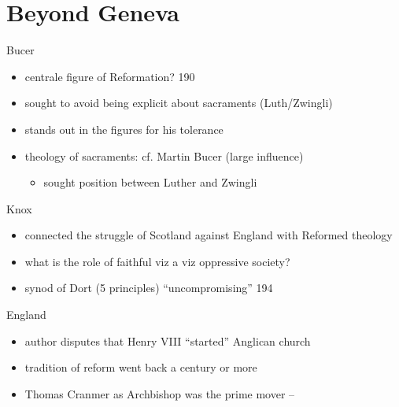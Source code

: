\section{Beyond Geneva}
\label{sec-3}
\begin{frame}[label=sec-3-1]{Bucer}
\begin{itemize}
\item centrale figure of Reformation? 190
\item sought to avoid being explicit about sacraments (Luth/Zwingli)
\item stands out in the figures for his tolerance
\item theology of sacraments: cf. \alert{Martin Bucer} (large influence)
\begin{itemize}
\item sought position between Luther and Zwingli
\end{itemize}
\end{itemize}
\end{frame}

\begin{frame}[label=sec-3-2]{Knox}
\begin{itemize}
\item connected the struggle of Scotland against England with Reformed theology
\item what is the role of faithful viz a viz oppressive society?
\item synod of Dort (5 principles) ``uncompromising'' 194
\end{itemize}
\end{frame}

\begin{frame}[label=sec-3-3]{England}
\begin{itemize}
\item author disputes that Henry VIII ``started'' Anglican church
\item tradition of reform went back a century or more
\item Thomas Cranmer as Archbishop was the prime mover --
\end{itemize}
\end{frame}

